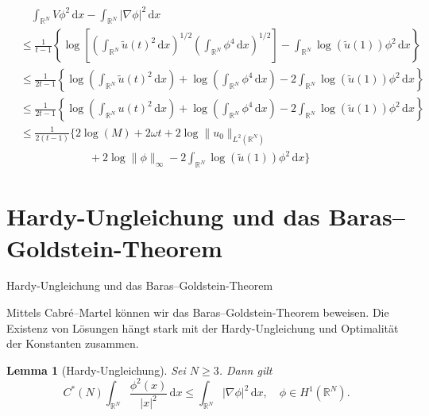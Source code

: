 \documentclass{beamer}
\newtheorem{lem}[thm]{Lemma}
\theoremstyle{break}
\begin{document}
\begin{frame}
\begin{align*}
&\quad\int_{\mathbb R^N} V \phi^2 \, \mathrm dx - \int_{\mathbb R^N} |\nabla \phi|^2\, \mathrm dx\\
&\le \frac{1}{t-1} \left \{ \log \left [ \left (\int_{\mathbb R^N} \tilde u(t)^2 \, \mathrm dx \right )^{1/2} \left ( \int_{\mathbb R^N} \phi^4 \, \mathrm dx \right )^{1/2}\right ] - \int_{\mathbb R^N} \log(\tilde u(1))\phi^2\, \mathrm dx \right \}\\
&\le \frac{1}{2t-1} \left \{ \log  \left (\int_{\mathbb R^N} \tilde u(t)^2 \, \mathrm dx \right )+ \log \left ( \int_{\mathbb R^N} \phi^4 \, \mathrm dx \right ) - 2 \int_{\mathbb R^N} \log(\tilde u(1))\phi^2\, \mathrm dx \right \}\\
&\le \frac{1}{2t-1} \left \{ \log  \left (\int_{\mathbb R^N} u(t)^2 \, \mathrm dx \right )+ \log \left ( \int_{\mathbb R^N} \phi^4 \, \mathrm dx \right ) - 2 \int_{\mathbb R^N} \log(\tilde u(1))\phi^2\, \mathrm dx \right \}\\
&\le \frac{1}{2(t-1)}\{2\log(M) + 2\omega t + 2\log \|u_0\|_{L^2(\mathbb R^N)}  \\
&\ \qquad\qquad\qquad+ 2\log\|\phi\|_\infty- 2\int_{\mathbb R^N} \log(\tilde u(1)) \phi^2\, \mathrm dx \}
\end{align*}
\end{frame}

\section{Hardy-Ungleichung und das Baras--Goldstein-Theorem}
\begin{frame}{Hardy-Ungleichung und das Baras--Goldstein-Theorem}

Mittels Cabr\'e--Martel können wir das Baras--Goldstein-Theorem beweisen. Die Existenz von Lösungen hängt stark mit der Hardy-Ungleichung und Optimalität der Konstanten zusammen.
\begin{lem}[Hardy-Ungleichung]
Sei $N\ge 3$. Dann gilt
\begin{equation}\label{hardy}
C^*(N) \int_{\mathbb R^N} \frac{\phi^2(x)}{|x|^2}\, \mathrm dx \le \int_{\mathbb R^N} |\nabla \phi|^2\, \mathrm dx, \quad \phi \in H^1(\mathbb R^N).
\end{equation}
\end{lem}
\end{frame}
\end{document}
